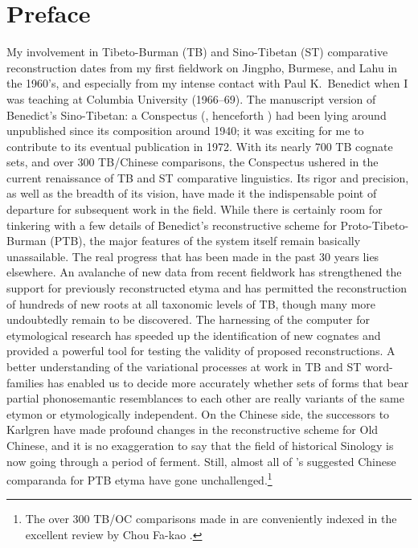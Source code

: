\vspace{0.25em}

\renewcommand{\thefootnote}{\arabic{footnote}}
\setcounter{footnote}{0}

\chapter*{Preface}

My involvement in Tibeto-Burman (TB) and Sino-Tibetan (ST) comparative reconstruction dates from my first fieldwork on Jingpho, Burmese, and Lahu in the 1960’s, and especially from my intense contact with Paul K.\ Benedict when I was teaching at Columbia University (1966–69). The manuscript version of Benedict’s Sino-Tibetan: a Conspectus (\citealt{STC}, henceforth \textit{}) had been lying around unpublished since its composition around 1940; it was exciting for me to contribute to its eventual publication in 1972. With its nearly 700 TB cognate sets, and over 300 TB/Chinese comparisons, the Conspectus ushered in the current renaissance of TB and ST comparative linguistics. Its rigor and precision, as well as the breadth of its vision, have made it the indispensable point of departure for subsequent work in the field. While there is certainly room for tinkering with a few details of Benedict’s reconstructive scheme for Proto-Tibeto-Burman (PTB), the major features of the system itself remain basically unassailable. The real progress that has been made in the past 30 years lies elsewhere. An avalanche of new data from recent fieldwork has strengthened the support for previously reconstructed etyma and has permitted the reconstruction of hundreds of new roots at all taxonomic levels of TB, though many more undoubtedly remain to be discovered. The harnessing of the computer for etymological research has speeded up the identification of new cognates and provided a powerful tool for testing the validity of proposed reconstructions. A better understanding of the variational processes at work in TB and ST word-families has enabled us to decide more accurately whether sets of forms that bear partial phonosemantic resemblances to each other are really variants of the same etymon or etymologically independent. On the Chinese side, the successors to Karlgren have made profound changes in the reconstructive scheme for Old Chinese, and it is no exaggeration to say that the field of historical Sinology is now going through a period of ferment. Still, almost all of \textit{}’s suggested Chinese comparanda for PTB etyma have gone unchallenged.\footnote{The over 300 TB/OC comparisons made in \textit{} are conveniently indexed in the excellent review by Chou Fa-kao \citeyearpar{ACST}.}

